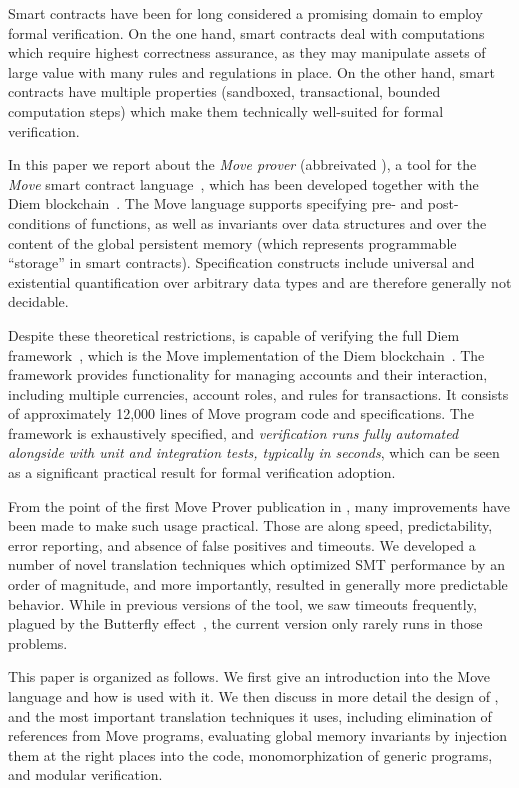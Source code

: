 
Smart contracts have been for long considered a promising domain to employ
formal verification.  On the one hand, smart contracts deal with computations
which require highest correctness assurance, as they may manipulate assets of
large value with many rules and regulations in place. On the other hand, smart
contracts have multiple properties (sandboxed, transactional, bounded
computation steps) which make them technically well-suited for formal
verification.

In this paper we report about the \emph{Move prover} (abbreivated \MVP), a tool
for the \emph{Move} smart contract language~\cite{MOVE_LANG}, which has been
developed together with the Diem blockchain~\cite{DIEM}. The Move language
supports specifying pre- and post-conditions of functions, as well as invariants
over data structures and over the content of the global persistent memory (which
represents programmable ``storage'' in smart contracts). Specification
constructs include universal and existential quantification over arbitrary data
types and are therefore generally not decidable.

Despite these theoretical restrictions, \MVP is capable of verifying the full
Diem framework~\cite{DIEM_FRAMEWORK}, which is the Move implementation of the
Diem blockchain~\cite{DIEM}. The framework provides functionality for managing
accounts and their interaction, including multiple currencies, account roles,
and rules for transactions.  It consists of approximately 12,000 lines of Move
program code and specifications.  The framework is exhaustively specified, and
\emph{verification runs fully automated alongside with unit and integration
  tests, typically in seconds}, which can be seen as a significant practical
result for formal verification adoption.

From the point of the first Move Prover publication in \cite{MOVE_PROVER}, many
improvements have been made to make such usage practical.  Those are along
speed, predictability, error reporting, and absence of false positives and
timeouts.  We developed a number of novel translation techniques which optimized
SMT performance by an order of magnitude, and more importantly, resulted in
generally more predictable behavior. While in previous versions of the tool, we
saw timeouts frequently, plagued by the Butterfly effect~\cite{BUTTERFLY}, the
current version only rarely runs in those problems.

This paper is organized as follows. We first give an introduction into the Move
language and how \MVP is used with it. We then discuss in more detail the design
of \MVP, and the most important translation techniques it uses, including
elimination of references from Move programs, evaluating global memory
invariants by injection them at the right places into the code, monomorphization
of generic programs, and modular verification.




